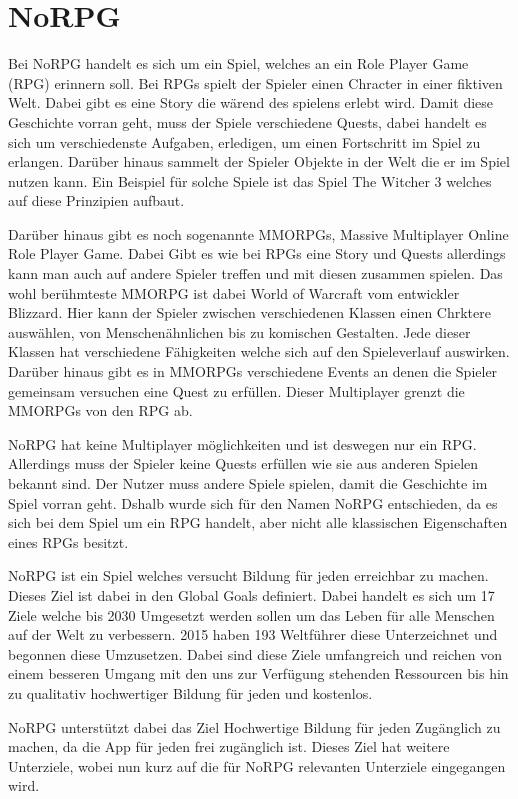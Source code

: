 \chapter{NoRPG}
Bei NoRPG handelt es sich um ein Spiel, welches an ein Role Player Game (RPG) erinnern soll. Bei RPGs spielt der Spieler einen Chracter in einer fiktiven Welt. Dabei gibt es eine Story die wärend des spielens erlebt wird. Damit diese Geschichte vorran geht, muss der Spiele verschiedene Quests, dabei handelt es sich um verschiedenste Aufgaben, erledigen, um einen Fortschritt im Spiel zu erlangen. Darüber hinaus sammelt der Spieler Objekte in der Welt die er im Spiel nutzen kann. Ein Beispiel für solche Spiele ist das Spiel The Witcher 3 welches auf diese Prinzipien aufbaut. 
	
Darüber hinaus gibt es noch sogenannte MMORPGs, Massive Multiplayer Online Role Player Game. Dabei Gibt es wie bei RPGs eine Story und Quests allerdings kann man auch auf andere Spieler treffen und mit diesen zusammen spielen. Das wohl berühmteste MMORPG ist dabei World of Warcraft vom entwickler Blizzard. Hier kann der Spieler zwischen verschiedenen Klassen einen Chrktere auswählen, von Menschenähnlichen bis zu komischen Gestalten. Jede dieser Klassen hat verschiedene Fähigkeiten welche sich auf den Spieleverlauf auswirken. Darüber hinaus gibt es in MMORPGs verschiedene Events an denen die Spieler gemeinsam versuchen eine Quest zu erfüllen. Dieser Multiplayer grenzt die MMORPGs von den RPG ab.

NoRPG hat keine Multiplayer möglichkeiten und ist deswegen nur ein RPG. Allerdings muss der Spieler keine Quests erfüllen wie sie aus anderen Spielen bekannt sind. Der Nutzer muss andere Spiele spielen, damit die Geschichte im Spiel vorran geht. Dshalb wurde sich für den Namen NoRPG entschieden, da es sich bei dem Spiel um ein RPG handelt, aber nicht alle klassischen Eigenschaften eines RPGs besitzt.
	
NoRPG ist ein Spiel welches versucht Bildung für jeden erreichbar zu machen. Dieses Ziel ist dabei in den Global Goals definiert. Dabei handelt es sich um 17 Ziele welche bis 2030 Umgesetzt werden sollen um das Leben für alle Menschen auf der Welt zu verbessern. 2015 haben 193 Weltführer diese Unterzeichnet und begonnen diese Umzusetzen. Dabei sind diese Ziele umfangreich und reichen von einem besseren Umgang mit den uns zur Verfügung stehenden Ressourcen bis hin zu qualitativ hochwertiger Bildung für jeden und kostenlos.

NoRPG unterstützt dabei das Ziel Hochwertige Bildung für jeden Zugänglich zu machen, da die App für jeden frei zugänglich ist. Dieses Ziel hat weitere Unterziele, wobei nun kurz auf die für NoRPG relevanten Unterziele eingegangen wird.

